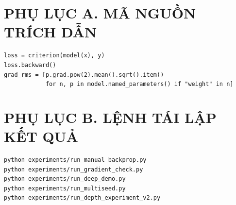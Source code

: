 \documentclass[12pt,a4paper]{report}
\begin{document}
\appendix
\chapter*{PHỤ LỤC A. MÃ NGUỒN TRÍCH DẪN}
\begin{lstlisting}[caption={Tính gradient RMS tại khởi tạo (trích, experiments/run\_deep\_demo.py)}]
loss = criterion(model(x), y)
loss.backward()
grad_rms = [p.grad.pow(2).mean().sqrt().item()
            for n, p in model.named_parameters() if "weight" in n]
\end{lstlisting}

\chapter*{PHỤ LỤC B. LỆNH TÁI LẬP KẾT QUẢ}
\begin{lstlisting}[language=bash]
python experiments/run_manual_backprop.py
python experiments/run_gradient_check.py
python experiments/run_deep_demo.py
python experiments/run_multiseed.py
python experiments/run_depth_experiment_v2.py
\end{lstlisting}
\end{document}
